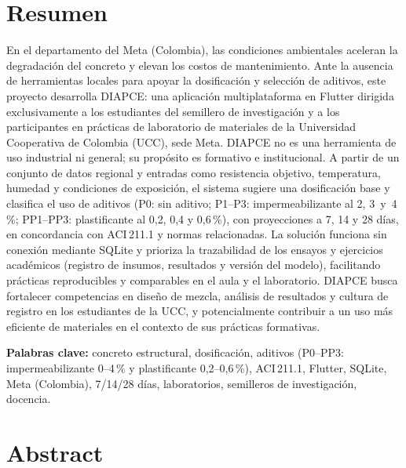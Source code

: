 \documentclass[12pt, letterpaper]{article}
\begin{document}
\newpage
{}
\setcounter{page}{1}

\section*{Resumen}

En el departamento del Meta (Colombia), las condiciones ambientales aceleran la degradación del concreto y elevan los costos de mantenimiento. Ante la ausencia de herramientas locales para apoyar la dosificación y selección de aditivos, este proyecto desarrolla DIAPCE: una aplicación multiplataforma en Flutter dirigida exclusivamente a los estudiantes del semillero de investigación y a los participantes en prácticas de laboratorio de materiales de la Universidad Cooperativa de Colombia (UCC), sede Meta. DIAPCE no es una herramienta de uso industrial ni general; su propósito es formativo e institucional. A partir de un conjunto de datos regional y entradas como resistencia objetivo, temperatura, humedad y condiciones de exposición, el sistema sugiere una dosificación base y clasifica el uso de aditivos (P0: sin aditivo; P1--P3: impermeabilizante al 2, 3~y~4\,\%; PP1--PP3: plastificante al 0{,}2, 0{,}4 y 0{,}6\,\%), con proyecciones a 7, 14 y 28 días, en concordancia con ACI\,211.1 y normas relacionadas. La solución funciona sin conexión mediante SQLite y prioriza la trazabilidad de los ensayos y ejercicios académicos (registro de insumos, resultados y versión del modelo), facilitando prácticas reproducibles y comparables en el aula y el laboratorio. DIAPCE busca fortalecer competencias en diseño de mezcla, análisis de resultados y cultura de registro en los estudiantes de la UCC, y potencialmente contribuir a un uso más eficiente de materiales en el contexto de sus prácticas formativas.

\vspace{0.5em}
\noindent\textbf{Palabras clave:} concreto estructural, dosificación, aditivos (P0--PP3: impermeabilizante 0--4\,\% y plastificante 0{,}2--0{,}6\,\%), ACI\,211.1, Flutter, SQLite, Meta (Colombia), 7/14/28 días, laboratorios, semilleros de investigación, docencia.

\newpage
\section*{Abstract}
\end{document}
